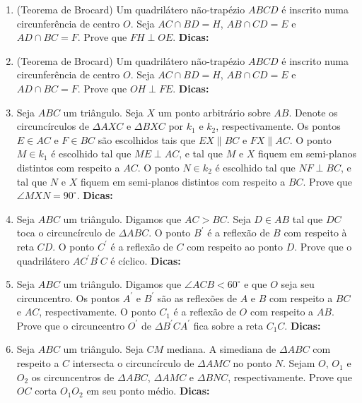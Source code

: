 \documentclass{article}
\newcommand{\dica}{\textbf{Dicas:}}
\newcommand{\iniTri}{Seja $ABC$ um triângulo}
\begin{document}
\begin{multicols}{2}
\begin{enumerate}
    \item (Teorema de Brocard) Um quadrilátero não-trapézio $ABCD$ é inscrito numa circunferência de centro $O$. Seja $AC\cap BD=H$, $AB\cap CD=E$ e $AD\cap BC=F$. Prove que $FH\perp OE$. \dica %
    
    \item (Teorema de Brocard) Um quadrilátero não-trapézio $ABCD$ é inscrito numa circunferência de centro $O$. Seja $AC\cap BD=H$, $AB\cap CD=E$ e $AD\cap BC=F$. Prove que $OH\perp FE$. \dica %
    
    \item \iniTri. Seja $X$ um ponto arbitrário sobre $AB$. Denote os circuncírculos de $\Delta AXC$ e $\Delta BXC$ por $k_1$ e $k_2$, respectivamente. Os pontos $E\in AC$ e $F\in BC$ são escolhidos tais que $EX\parallel BC$ e $FX\parallel AC$. O ponto $M\in k_1$ é escolhido tal que $ME\perp AC$, e tal que $M$ e $X$ fiquem em semi-planos distintos com respeito a $AC$. O ponto $N\in k_2$ é escolhido tal que $NF\perp BC$, e tal que $N$ e $X$ fiquem em semi-planos distintos com respeito a $BC$. Prove que $\angle MXN=90^{\circ}$. \dica %
    
    \item \iniTri. Digamos que $AC>BC$. Seja $D\in AB$ tal que $DC$ toca o circuncírculo de $\Delta ABC$. O ponto $B^{\prime}$ é a reflexão de $B$ com respeito à reta $CD$. O ponto $C^{\prime}$ é a reflexão de $C$ com respeito ao ponto $D$. Prove que o quadrilátero $AC^{\prime}B^{\prime}C$ é cíclico. \dica %
    
    \item \iniTri. Digamos que $\angle ACB<60^{\circ}$ e que $O$ seja seu circuncentro. Os pontos $A^{\prime}$ e $B^{\prime}$ são as reflexões de $A$ e $B$ com respeito a $BC$ e $AC$, respectivamente. O ponto $C_1$ é a reflexão de $O$ com respeito a $AB$. Prove que o circuncentro $O^{\prime}$ de $\Delta B^{\prime}CA^{\prime}$ fica sobre a reta $C_1C$. \dica %
    
    \item \iniTri. Seja $CM$ mediana. A simediana de $\Delta ABC$ com respeito a $C$ intersecta o circuncírculo de $\Delta AMC$ no ponto $N$. Sejam $O$, $O_1$ e $O_2$ os circuncentros de $\Delta ABC$, $\Delta AMC$ e $\Delta BNC$, respectivamente. Prove que $OC$ corta $O_1O_2$ em seu ponto médio. \dica %
    

\end{enumerate}
\end{multicols}
\end{document}
